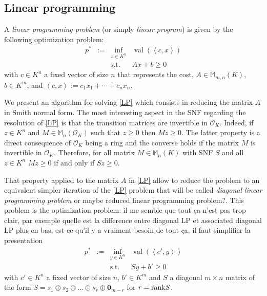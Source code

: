 \documentclass[a4paper,12pt]{article}
\newcommand{\allmat}{\mathbb{M}} %
\newcommand{\simone}[1]{{\color{blue} #1}} %
\newcommand{\corentin}[1]{{\color{red} #1}} %
\DeclareMathOperator{\val}{val}
\newcommand{\OK}{\mathcal{O}_K}
\begin{document}
\subsection{Linear programming}

A \emph{linear programming problem} (or simply \emph{linear program}) is given by the following
optimization problem:
\begin{equation}
  \tag{LP}\label{LP}
\begin{array}{rcll}
  p^* & := & \inf_{x \in K^n} & \val(\left\langle c, x \right\rangle) \\
  &    & \text{s.t.}         & A x + b \geq 0
\end{array}
\end{equation}
with $c \in K^n$ a fixed vector of size $n$ that represents the cost, $A \in \allmat_{m,n}(K)$, $b \in K^m$,
and $\left\langle c, x \right\rangle := c_1x_1+\cdots +c_nx_n$.

We present an algorithm for solving \eqref{LP} which consists in reducing the matrix $A$ in Smith normal form.
The most interesting aspect in the SNF regarding the resolution of \ref{LP} is that the transition matrices are invertible in $\OK$. Indeed, if $z \in K^n$ and $M \in \allmat_n(\OK)$ such that $z \geq 0$ then $Mz \geq 0$. The latter property is a direct consequence of $\OK$ being a ring and the converse holds if the matrix $M$ is invertible in $\OK$. Therefore, for all matrix $M \in \allmat_n(K)$ with SNF $S$ and all $z \in K^n$ $Mz \geq 0$ if and only if $Sz \geq 0$.
 

That property applied to the matrix $A$ in \ref{LP} allow to reduce the problem to an equivalent simpler iteration of the \ref{LP} problem that will be called \emph{diagonal linear programming problem} \corentin{or maybe reduced linear programming problem?}. This problem is the optimization problem: \simone{il me semble que tout ça n'est pas trop clair, par exemple quelle est la difference entre diagonal LP et associated diagonal LP plus en bas, est-ce qu'il y a vraiment besoin de tout ça, il faut simplifier la presentation}
\begin{equation}
  \tag{DLP}\label{DLP}
\begin{array}{rcll}
  p^* & := & \inf_{y \in K^n} & \val(\left\langle c', y \right\rangle) \\
  &    & \text{s.t.}         & S y + b' \geq 0
\end{array}
\end{equation}
with $c' \in K^n$ a fixed vector of size $n$, $b' \in K^m$ and $S$ a diagonal $m \times n$ matrix of the form $S = s_1 \oplus s_2 \oplus \ldots \oplus s_r \oplus { \bm 0}_{m-r} $ for $r={\rm rank} S$.
\end{document}
